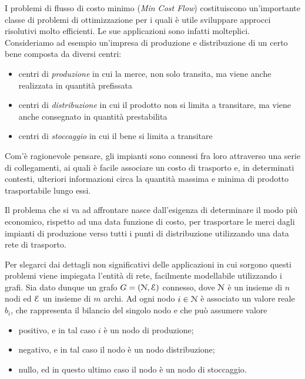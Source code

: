 \label{intro}


I problemi di flusso di costo minimo (\emph{Min Cost Flow}) costituiscono un'importante classe di problemi di ottimizzazione per i quali è utile sviluppare approcci risolutivi molto efficienti.
Le sue applicazioni sono infatti molteplici.\\
Consideriamo ad esempio un'impresa di produzione e distribuzione di un certo bene composta da diversi centri:

\begin{itemize}
	\item centri di \emph{produzione} in cui la merce, non solo transita, ma viene anche realizzata in quantità prefissata
	\item centri di \emph{distribuzione} in cui il prodotto non si limita a transitare, ma viene anche consegnato in quantità prestabilita
	\item centri di \emph{stoccaggio}  in cui il bene si limita a transitare
\end{itemize}
Com'è ragionevole pensare, gli impianti sono connessi fra loro attraverso una serie di collegamenti, ai quali è facile associare un costo di trasporto e, in determinati contesti, ulteriori informazioni circa la quantità massima e minima di prodotto trasportabile lungo essi. 

Il problema che si va ad affrontare nasce dall'esigenza di determinare il modo più economico, rispetto ad una data funzione di costo, per trasportare le merci dagli impianti di produzione verso tutti i punti di distribuzione utilizzando una data rete di trasporto.

Per slegarci dai dettagli non significativi delle applicazioni in cui sorgono questi problemi viene impiegata l’entità di rete, facilmente modellabile utilizzando i grafi.
Sia dato dunque un grafo $G=(\mathcal{N}, \mathcal{E})$ connesso, dove $\mathcal{N}$ è un insieme di $n$ nodi ed $\mathcal{E}$ un insieme di $m$ archi. Ad ogni nodo $i \in \mathcal{N}$ è associato un valore reale $b_i$, che rappresenta il bilancio del singolo nodo e che può assumere valore

\begin{itemize}
\item positivo, e in tal caso $i$ è un nodo di produzione;
\item negativo, e in tal caso il nodo è un nodo distribuzione;
\item nullo, ed in questo ultimo caso il nodo è un nodo di stoccaggio.
\end{itemize}

